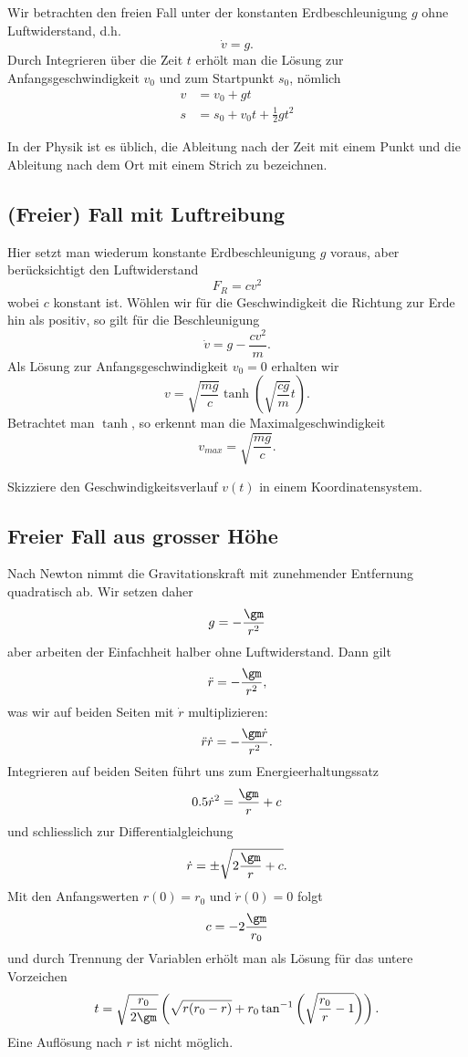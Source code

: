 \documentclass[%
11pt,%
twoside,%
titlepage,%
german,%
headsepline%
]{scrartcl}
\begin{document}
Wir betrachten den freien Fall unter der konstanten Erdbeschleunigung $g$ ohne Luftwiderstand, d.h.
$$\dot{v}=g.$$
Durch Integrieren \"uber die Zeit $t$ erh\"olt man die L\"osung zur Anfangsgeschwindigkeit $v_0$ und zum Startpunkt $s_0$, n\"omlich
\begin{align*}
v &= v_0+gt\\
s &= s_0+v_0t+\frac{1}{2}gt^2
\end{align*}

\begin{bem}
In der Physik ist es \"ublich, die Ableitung nach der Zeit mit einem Punkt und die Ableitung nach dem Ort mit einem Strich zu bezeichnen.
\end{bem}

\subsection{(Freier) Fall mit Luftreibung}

Hier setzt man wiederum konstante Erdbeschleunigung $g$ voraus, aber ber\"ucksichtigt den Luftwiderstand
$$F_R=cv^2$$
wobei $c$ konstant ist. W\"ohlen wir f\"ur die Geschwindigkeit die Richtung zur Erde hin als positiv, so gilt f\"ur die Beschleunigung
$$\dot{v}=g-\frac{cv^2}{m}.$$
Als L\"osung zur Anfangsgeschwindigkeit $v_0=0$ erhalten wir
$$v=\sqrt{\frac{mg}{c}}\tanh\left(\sqrt{\frac{cg}{m}}t\right).$$
Betrachtet man $\tanh$, so erkennt man die Maximalgeschwindigkeit
$$v_{max}=\sqrt{\frac{mg}{c}}.$$

\begin{ueb}
Skizziere den Geschwindigkeitsverlauf $v(t)$ in einem Koordinatensystem.
\end{ueb}

\subsection{Freier Fall aus grosser H\"ohe}

Nach Newton nimmt die Gravitationskraft mit zunehmender Entfernung quadratisch ab. Wir setzen daher
$$g=-\frac{\gm}{r^2}$$
aber arbeiten der Einfachheit halber ohne Luftwiderstand. Dann gilt
$$\ddot{r}=-\frac{\gm}{r^2},$$
was wir auf beiden Seiten mit $\dot{r}$ multiplizieren:
$$\ddot{r}\dot{r}=-\frac{\gm\dot{r}}{r^2}.$$
Integrieren auf beiden Seiten f\"uhrt uns zum Energieerhaltungssatz
$$0.5\dot{r}^2=\frac{\gm}{r}+c$$
und schliesslich zur Differentialgleichung
$$\dot{r}=\pm\sqrt{2\frac{\gm}{r}+c}.$$
Mit den Anfangswerten $r(0)=r_0$ und $\dot{r}(0)=0$ folgt
$$c=-2\frac{\gm}{r_0}$$
und durch Trennung der Variablen erh\"olt man als L\"osung f\"ur das untere Vorzeichen
$$t=\sqrt{\frac{r_0}{2\gm}}\left(\sqrt{r(r_0-r)}+r_0\tan^{-1}\left(\sqrt{\frac{r_0}{r}-1}\right)\right).$$
Eine Aufl\"osung nach $r$ ist nicht m\"oglich.
\end{document}
